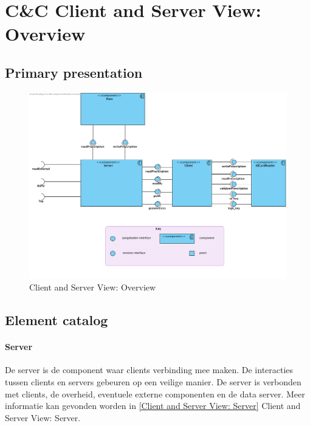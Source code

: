 \documentclass[a4paper,10pt]{article}
\begin{document}
\clearpage
\section{C\&C Client and Server View: Overview}
\label{Client and Server View: Overview}

\subsection{Primary presentation}

\begin{figure}[!ht]
  \includegraphics[width=\textwidth]{../images/ClientServer_Overview.png}
  \caption{Client and Server View: Overview}
\end{figure}

\subsection{Element catalog}

\paragraph{Server}
De server is de component waar clients verbinding mee maken.  De interacties tussen clients en servers gebeuren op een veilige manier.  De server is verbonden met clients, de overheid, eventuele externe componenten en de data server.  Meer informatie kan gevonden worden in \ref{Client and Server View: Server} Client and Server View: Server.
\end{document}
